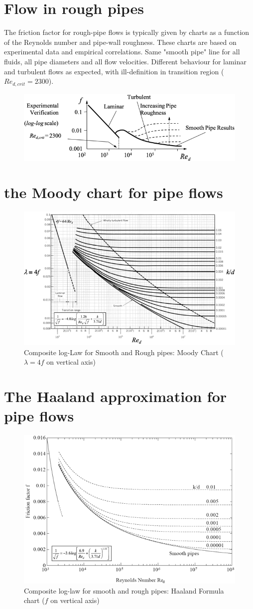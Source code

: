 \documentclass[class=report, crop=false, 12pt,a4paper]{standalone}
\begin{document}
\section{Flow in rough pipes}
The friction factor for rough-pipe flows is typically given by charts as a function of  the Reynolds number and pipe-wall roughness. These charts are based on experimental data and empirical correlations. Same "smooth pipe" line for all fluids, all pipe diameters and all flow velocities. Different behaviour for laminar and turbulent flows as expected, with ill-definition in transition region ($Re_{d, crit} = 2300$).
\begin{figure}[H]
  \centering
  \includegraphics[width = 0.7 \textwidth]{../img/diagram89.png}
  \caption{}
\end{figure}
\section{the Moody chart for pipe flows}
\begin{figure}[H]
  \centering
  \includegraphics[width = 0.7 \textwidth]{../img/diagram90.png}
  \caption{Composite log-Law for Smooth and Rough pipes: Moody Chart ($\lambda = 4f$ on vertical axis)}
\end{figure}
\section{The Haaland approximation for pipe flows}
\begin{figure}[H]
  \centering
  \includegraphics[width = 0.7 \textwidth]{../img/diagram91.png}
  \caption{Composite log-law for smooth and rough pipes: Haaland Formula chart ($f$ on vertical axis)}
\end{figure}
\end{document}
